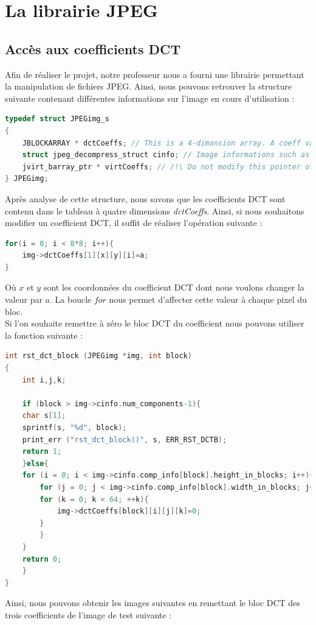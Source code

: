 \section{La librairie JPEG}
\subsection{Accès aux coefficients DCT}
Afin de réaliser le projet, notre professeur nous a fourni une librairie permettant la manipulation de fichiers JPEG. Ainsi, nous pouvons retrouver la structure suivante contenant différentes informations sur l'image en cours d'utilisation :
\begin{lstlisting}[language=C,style=customc]
typedef struct JPEGimg_s
{
	JBLOCKARRAY * dctCoeffs; // This is a 4-dimansion array. A coeff value is available in <structName>.dctCoeffs[comp][lin][col][pos]
	struct jpeg_decompress_struct cinfo; // Image informations such as number of components, size etc.
	jvirt_barray_ptr * virtCoeffs; // /!\ Do not modify this pointer of content /!\.
} JPEGimg; 
\end{lstlisting}
Après analyse de cette structure, nous savons que les coefficients DCT sont contenu dans le tableau à quatre dimensions \textit{dctCoeffs}. Ainsi, si nous souhaitons modifier un coefficient DCT, il suffit de réaliser l'opération suivante :
\begin{lstlisting}[language=C, style=customc]
for(i = 0; i < 8*8; i++){
    img->dctCoeffs[1][x][y][i]=a;
}
\end{lstlisting}
Où $x$ et $y$ sont les coordonnées du coefficient DCT dont nous voulons changer la valeur par $a$. La boucle $for$ nous permet d'affecter cette valeur à chaque pixel du bloc.\\
Si l'on souhaite remettre à zéro le bloc DCT du coefficient nous pouvons utiliser la fonction suivante :
\begin{lstlisting}[language=C, style=customc]
int rst_dct_block (JPEGimg *img, int block)
{
    int i,j,k;

    if (block > img->cinfo.num_components-1){
	char s[1];
	sprintf(s, "%d", block);
	print_err ("rst_dct_block()", s, ERR_RST_DCTB);
	return 1;
    }else{
	for (i = 0; i < img->cinfo.comp_info[block].height_in_blocks; i++){
	    for (j = 0; j < img->cinfo.comp_info[block].width_in_blocks; j++){
		for (k = 0; k < 64; ++k){
		    img->dctCoeffs[block][i][j][k]=0;
		}
	    }
	}
	return 0;
    }
}
\end{lstlisting}
Ainsi, nous pouvons obtenir les images suivantes en remettant le bloc DCT des trois coefficients de l'image de test suivante :
